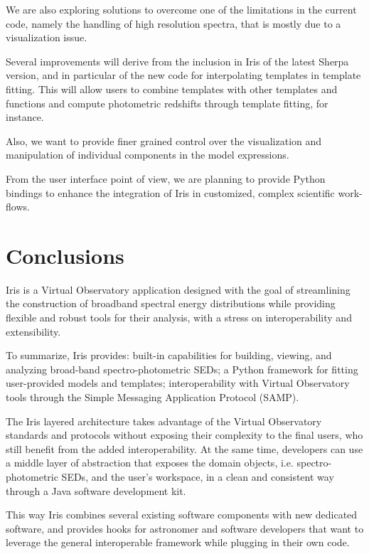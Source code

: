 \documentclass[final,5p,authoryear]{elsarticle}
\begin{document}
We are also exploring solutions to overcome one of the limitations in the
current code, namely the handling of high resolution spectra, that is mostly due
to a visualization issue.

Several improvements will derive from the inclusion in Iris of the latest Sherpa
version, and in particular of the new code for interpolating templates in
template fitting. This will allow users to combine templates with other
templates and functions and compute photometric redshifts through template
fitting, for instance.

Also, we want to provide finer grained control over the visualization and
manipulation of individual components in the model expressions.

From the user interface point of view, we are planning to provide Python
bindings to enhance the integration of Iris in customized, complex scientific
work-flows.

\section{Conclusions} \label{sec:conclusions}

Iris is a Virtual Observatory application designed with the goal of streamlining
the construction of broadband spectral energy distributions while providing
flexible and robust tools for their analysis, with a stress on interoperability
and extensibility.

To summarize, Iris provides: built-in capabilities for building, viewing, and
analyzing broad-band spectro-photometric SEDs; a Python framework for fitting
user-provided models and templates; interoperability with Virtual Observatory
tools through the Simple Messaging Application Protocol (SAMP).

The Iris layered architecture takes advantage of the Virtual Observatory
standards and protocols without exposing their complexity to the final users,
who still benefit from the added interoperability. At the same time, developers
can use a middle layer of abstraction that exposes the domain objects, i.e.
spectro-photometric SEDs, and the user's workspace, in a clean and consistent
way through a Java software development kit.

This way Iris combines several existing software components with new dedicated
software, and provides hooks for astronomer and software developers that want to
leverage the general interoperable framework while plugging in their own code.
\end{document}
